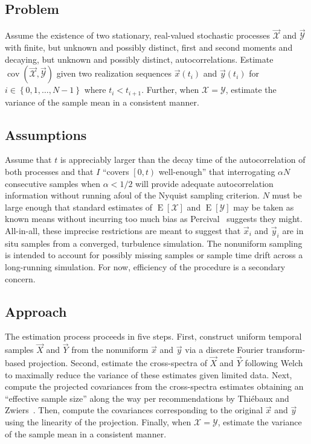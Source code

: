 \documentclass[letterpaper,11pt,nointlimits,reqno]{amsart}
\DeclareMathOperator{\cov}{cov}
\begin{document}
\subsection*{Problem}

Assume the existence of two stationary, real-valued stochastic processes
$\vec{\mathscr{X}}$ and $\vec{\mathscr{Y}}$ with finite, but unknown and
possibly distinct, first and second moments and decaying, but unknown and
possibly distinct, autocorrelations.  Estimate
$\cov\left(\vec{\mathscr{X}},\vec{\mathscr{Y}}\right)$ given two realization
sequences $\vec{x}\left(t_i\right)$ and $\vec{y}\left(t_i\right)$ for
$i\in\left\{0,1,\dots,N-1\right\}$ where $t_i < t_{i+1}$.  Further, when
$\mathscr{X}=\mathscr{Y}$, estimate the variance of the sample mean in a
consistent manner.

\subsection*{Assumptions}

Assume that $t$ is appreciably larger than the decay time of the
autocorrelation of both processes and that $I$ ``covers $\left[0,t\right)$
well-enough'' that interrogating $\alpha N$ consecutive samples when
$\alpha<1/2$ will provide adequate autocorrelation information without running
afoul of the Nyquist sampling criterion.  $N$ must be large enough that
standard estimates of $\operatorname{E}\left[\mathscr{X}\right]$ and
$\operatorname{E}\left[\mathscr{Y}\right]$ may be taken as known means without
incurring too much bias as Percival~\cite{Percival1993Three} suggests they
might.  All-in-all, these imprecise restrictions are meant to suggest that
$\vec{x}_i$ and $\vec{y}_i$ are in situ samples from a converged, turbulence
simulation.  The nonuniform sampling is intended to account for possibly
missing samples or sample time drift across a long-running simulation.  For
now, efficiency of the procedure is a secondary concern.

\subsection*{Approach}

The estimation process proceeds in five steps.  First, construct uniform
temporal samples $\vec{X}$ and $\vec{Y}$ from the nonuniform $\vec{x}$ and
$\vec{y}$ via a discrete Fourier transform-based projection.  Second, estimate
the cross-spectra of $\vec{X}$ and $\vec{Y}$ following
Welch~\cite{Welch1967Use} to maximally reduce the variance of these estimates
given limited data.  Next, compute the projected covariances from the
cross-spectra estimates obtaining an ``effective sample size'' along the way
per recommendations by Thi\'{e}baux and
Zwiers~\cite{Thiebaux1984Interpretation}.  Then, compute the covariances
corresponding to the original $\vec{x}$ and $\vec{y}$ using the linearity of
the projection.  Finally, when $\mathscr{X}=\mathscr{Y}$, estimate the variance
of the sample mean in a consistent manner.
\end{document}
